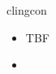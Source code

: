 \begin{frame}{clingcon}
  \begin{itemize}
  \item <1-> TBF
  \item {} \cite{bakaossc16a}
  \end{itemize}
\end{frame}
%
